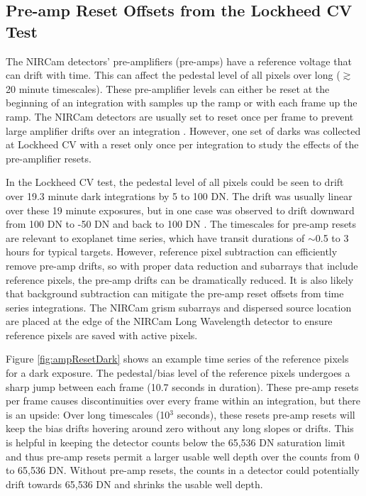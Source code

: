 \documentclass{aastex62}
\begin{document}
\subsection{Pre-amp Reset Offsets from the Lockheed CV Test}\label{sec:preAmp}

The NIRCam detectors' pre-amplifiers (pre-amps) have a reference voltage that can drift with time.
This can affect the pedestal level of all pixels over long ($\gtrsim$ 20 minute timescales).
These pre-amplifier levels can either be reset at the beginning of an integration with samples up the ramp or with each frame up the ramp.
The NIRCam detectors are usually set to reset once per frame to prevent large amplifier drifts over an integration \citep{robberto2014refPixPreAmp}.
However, one set of darks was collected at Lockheed CV with a reset only once per integration to study the effects of the pre-amplifier resets.

In the Lockheed CV test, the pedestal level of all pixels could be seen to drift over 19.3 minute dark integrations by 5 to 100 DN.
The drift was usually linear over these 19 minute exposures, but in one case was observed to drift downward from 100 DN to -50 DN and back to 100 DN \citep{robberto2014refPixPreAmp}.
The timescales for pre-amp resets are relevant to exoplanet time series, which have transit durations of $\sim$0.5 to 3 hours for typical targets.
However, reference pixel subtraction can efficiently remove pre-amp drifts, so with proper data reduction and subarrays that include reference pixels, the pre-amp drifts can be dramatically reduced.
It is also likely that background subtraction can mitigate the pre-amp reset offsets from time series integrations.
The NIRCam grism subarrays and dispersed source location are placed at the edge of the NIRCam Long Wavelength detector to ensure reference pixels are saved with active pixels.

Figure \ref{fig:ampResetDark} shows an example time series of the reference pixels for a dark exposure.
The pedestal/bias level of the reference pixels undergoes a sharp jump between each frame (10.7 seconds in duration).
These pre-amp resets per frame causes discontinuities over every frame within an integration, but there is an upside:
Over long timescales (10$^3$ seconds), these resets pre-amp resets will keep the bias drifts hovering around zero without any long slopes or drifts.
This is helpful in keeping the detector counts below the 65,536 DN saturation limit and thus pre-amp resets permit a larger usable well depth over the counts from 0 to 65,536 DN.
Without pre-amp resets, the counts in a detector could potentially drift towards 65,536 DN and shrinks the usable well depth.
\end{document}
